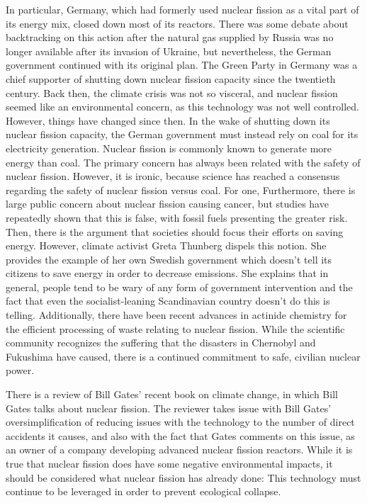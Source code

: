 \documentclass[12pt,letterpaper]{article}
\begin{document}
\begin{flushleft}
In particular, Germany, which had formerly used nuclear fission as a vital part of its energy mix, closed down most of its reactors. There was some debate about backtracking on this action after the natural gas supplied by Russia was no longer available after its invasion of Ukraine, but nevertheless, the German government continued with its original plan. The Green Party in Germany was a chief supporter of shutting down nuclear fission capacity since the twentieth century. Back then, the climate crisis was not so visceral, and nuclear fission seemed like an environmental concern, as this technology was not well controlled. \autocite{noauthor_q_2021} However, things have changed since then. In the wake of shutting down its nuclear fission capacity, the German government must instead rely on coal for its electricity generation. Nuclear fission is commonly known to generate more energy than coal. The primary concern has always been related with the safety of nuclear fission. However, it is ironic, because science has reached a consensus regarding the safety of nuclear fission versus coal. For one,  Furthermore, there is large public concern about nuclear fission causing cancer, but studies have repeatedly shown that this is false, with fossil fuels presenting the greater risk. \autocite{cohen_greta_nodate} Then, there is the argument that societies should focus their efforts on saving energy. However, climate activist Greta Thunberg dispels this notion. She provides the example of her own Swedish government which doesn't tell its citizens to save energy in order to decrease emissions. She explains that in general, people tend to be wary of any form of government intervention and the fact that even the socialist-leaning Scandinavian country doesn't do this is telling. \autocite{noauthor_why_2022} Additionally, there have been recent advances in actinide chemistry for the efficient processing of waste relating to nuclear fission. \autocite{costa_peluzo_uranium_2022} While the scientific community recognizes the suffering that the disasters in Chernobyl and Fukushima have caused, there is a continued commitment to safe, civilian nuclear power.

There is a review of Bill Gates' recent book on climate change, in which Bill Gates talks about nuclear fission. The reviewer takes issue with Bill Gates' oversimplification of reducing issues with the technology to the number of direct accidents it causes, and also with the fact that Gates comments on this issue, as an owner of a company developing advanced nuclear fission reactors. \autocite{reader_resolutereader_2021} While it is true that nuclear fission does have some negative environmental impacts, it should be considered what nuclear fission has already done:  \autocite{cohen_greta_nodate} This technology must continue to be leveraged in order to prevent ecological collapse.


\end{flushleft}
\end{document}
